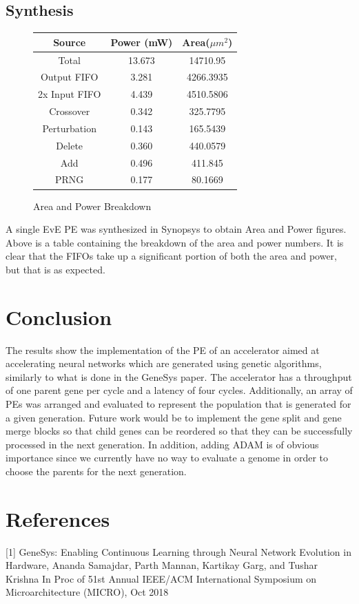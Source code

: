 \documentclass[preprint,pre,floats,aps,amsmath,amssymb]{revtex4}
\begin{document}
\subsection{Synthesis}
\begin{figure}[h!]
	\begin{center}
		\begin{tabular}{|c|c|c|}
			\hline
			Source & Power (mW) & Area($\mu m^2$)  \\ \hline
			Total & 13.673 & 14710.95\\ \hline
			Output FIFO & 3.281 & 4266.3935\\ \hline
			2x Input FIFO & 4.439 & 4510.5806\\ \hline
			Crossover & 0.342 & 325.7795\\ \hline
			Perturbation & 0.143 & 165.5439\\ \hline
			Delete & 0.360 & 440.0579\\ \hline
			Add & 0.496 & 411.845\\ \hline
			PRNG & 0.177 & 80.1669\\ \hline

		\end{tabular}
	\end{center}
	\caption{Area and Power Breakdown}

\end{figure}
\FloatBarrier
A single EvE PE was synthesized in Synopsys to obtain Area and Power figures. Above is a table containing the breakdown of the area and power numbers. It is clear that the FIFOs take up a significant portion of both the area and power, but that is as expected.

\section{Conclusion}
The results show the implementation of the PE of an accelerator aimed at accelerating neural networks which are generated using genetic algorithms, similarly to what is done in the GeneSys paper. The accelerator has a throughput of one parent gene per cycle and a latency of four cycles. Additionally, an array of PEs was arranged and evaluated to represent the population that is generated for a given generation. Future work would be to implement the gene split and gene merge blocks so that child genes can be reordered so that they can be successfully processed in the next generation. In addition, adding ADAM is of obvious importance since we currently have no way to evaluate a genome in order to  choose the parents for the next generation.


\section{References}
[1] GeneSys: Enabling Continuous Learning through Neural Network Evolution in Hardware, Ananda Samajdar, Parth Mannan, Kartikay Garg, and Tushar Krishna In Proc of 51st Annual IEEE/ACM International Symposium on Microarchitecture (MICRO), Oct 2018
\end{document}

